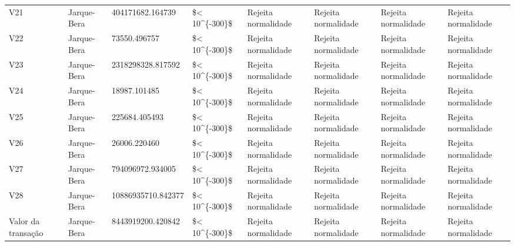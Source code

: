 \begin{longtable}{llllllll}
V21 & Jarque-Bera & 404171682.164739 & \$< 10\textasciicircum \{-300\}\$ & Rejeita normalidade & Rejeita normalidade & Rejeita normalidade & Rejeita normalidade \\
V22 & Jarque-Bera & 73550.496757 & \$< 10\textasciicircum \{-300\}\$ & Rejeita normalidade & Rejeita normalidade & Rejeita normalidade & Rejeita normalidade \\
V23 & Jarque-Bera & 2318298328.817592 & \$< 10\textasciicircum \{-300\}\$ & Rejeita normalidade & Rejeita normalidade & Rejeita normalidade & Rejeita normalidade \\
V24 & Jarque-Bera & 18987.101485 & \$< 10\textasciicircum \{-300\}\$ & Rejeita normalidade & Rejeita normalidade & Rejeita normalidade & Rejeita normalidade \\
V25 & Jarque-Bera & 225684.405493 & \$< 10\textasciicircum \{-300\}\$ & Rejeita normalidade & Rejeita normalidade & Rejeita normalidade & Rejeita normalidade \\
V26 & Jarque-Bera & 26006.220460 & \$< 10\textasciicircum \{-300\}\$ & Rejeita normalidade & Rejeita normalidade & Rejeita normalidade & Rejeita normalidade \\
V27 & Jarque-Bera & 794096972.934005 & \$< 10\textasciicircum \{-300\}\$ & Rejeita normalidade & Rejeita normalidade & Rejeita normalidade & Rejeita normalidade \\
V28 & Jarque-Bera & 10886935710.842377 & \$< 10\textasciicircum \{-300\}\$ & Rejeita normalidade & Rejeita normalidade & Rejeita normalidade & Rejeita normalidade \\
Valor da transação & Jarque-Bera & 8443919200.420842 & \$< 10\textasciicircum \{-300\}\$ & Rejeita normalidade & Rejeita normalidade & Rejeita normalidade & Rejeita normalidade \\
\end{longtable}
